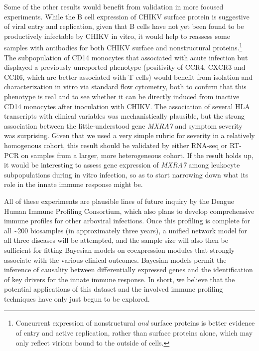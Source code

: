 Some of the other results would benefit from validation in more focused experiments. While the B cell expression of CHIKV surface protein is suggestive of viral entry and replication, given that B cells have not yet been found to be productively infectable by CHIKV in vitro,\autocite{Her2010,Sourisseau2007,Teng2012a} it would help to reassess some samples with antibodies for both CHIKV surface and nonstructural proteins.\footnote{Concurrent expression of nonstructural \emph{and} surface proteins is better evidence of entry and active replication, rather than surface proteins alone, which may only reflect virions bound to the outside of cells.} The subpopulation of CD14\sups{+} monocytes that associated with acute infection but displayed a previously unreported phenotype (positivity of CCR4, CXCR3 and CCR6, which are better associated with T cells) would benefit from isolation and characterization in vitro via standard flow cytometry, both to confirm that this phenotype is real and to see whether it can be directly induced from inactive CD14\sups{+} monocytes after inoculation with CHIKV. The association of several HLA transcripts with clinical variables was mechanistically plausible, but the strong association between the little-understood gene \emph{MXRA7} and symptom severity was surprising. Given that we used a very simple rubric for severity in a relatively homogenous cohort, this result should be validated by either RNA-seq or RT-PCR on samples from a larger, more heterogeneous cohort. If the result holds up, it would be interesting to assess gene expression of \emph{MXRA7} among leukocyte subpopulations during in vitro infection, so as to start narrowing down what its role in the innate immune response might be.

All of these experiments are plausible lines of future inquiry by the Dengue Human Immune Profiling Consortium, which also plans to develop comprehensive immune profiles for other arboviral infections. Once this profiling is complete for all \textasciitilde 200 biosamples (in approximately three years), a unified network model for all three diseases will be attempted, and the sample size will also then be sufficient for fitting Bayesian models on coexpression modules that strongly associate with the various clinical outcomes. Bayesian models permit the inference of causality between differentially expressed genes and the identification of key drivers for the innate immune response. In short, we believe that the potential applications of this dataset and the involved immune profiling techniques have only just begun to be explored.

